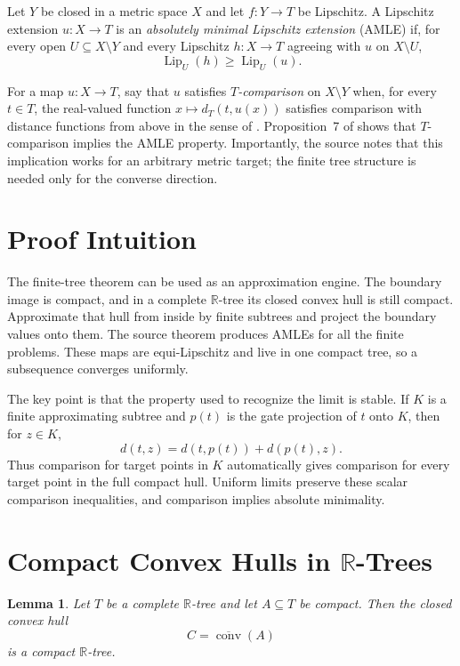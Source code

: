 \documentclass[11pt]{article}
\newtheorem{lemma}{Lemma}
\newcommand{\R}{\mathbb R}
\newcommand{\Lip}{\operatorname{Lip}}
\newcommand{\conv}{\operatorname{conv}}
\begin{document}
Let $Y$ be closed in a metric space $X$ and let $f:Y\to T$ be Lipschitz.  A
Lipschitz extension $u:X\to T$ is an \emph{absolutely minimal Lipschitz
extension} (AMLE) if, for every open $U\subseteq X\setminus Y$ and every
Lipschitz $h:X\to T$ agreeing with $u$ on $X\setminus U$,
\[
 \Lip_U(h)\geq \Lip_U(u).
\]

For a map $u:X\to T$, say that $u$ satisfies \emph{$T$-comparison} on
$X\setminus Y$ when, for every $t\in T$, the real-valued function
$x\mapsto d_T(t,u(x))$ satisfies comparison with distance functions from
above in the sense of \cite[Section~2]{NS}.  Proposition~7 of \cite{NS}
shows that $T$-comparison implies the AMLE property.  Importantly, the source
notes that this implication works for an arbitrary metric target; the finite
tree structure is needed only for the converse direction.

\section*{Proof Intuition}

The finite-tree theorem can be used as an approximation engine.  The boundary
image is compact, and in a complete $\R$-tree its closed convex hull is still
compact.  Approximate that hull from inside by finite subtrees and project the
boundary values onto them.  The source theorem produces AMLEs for all the
finite problems.  These maps are equi-Lipschitz and live in one compact tree,
so a subsequence converges uniformly.

The key point is that the property used to recognize the limit is stable.
If $K$ is a finite approximating subtree and $p(t)$ is the gate projection of
$t$ onto $K$, then for $z\in K$,
\[
 d(t,z)=d(t,p(t))+d(p(t),z).
\]
Thus comparison for target points in $K$ automatically gives comparison for
every target point in the full compact hull.  Uniform limits preserve these
scalar comparison inequalities, and comparison implies absolute minimality.

\section*{Compact Convex Hulls in $\R$-Trees}

\begin{lemma}\label{lem:hull}
Let $T$ be a complete $\R$-tree and let $A\subseteq T$ be compact.  Then the
closed convex hull
\[
 C=\overline{\conv}(A)
\]
is a compact $\R$-tree.
\end{lemma}
\end{document}
